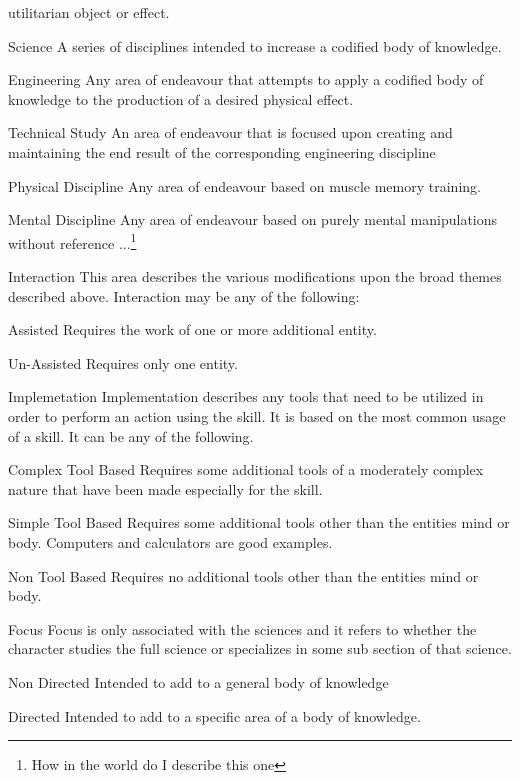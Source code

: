 \begin{relate}
\begin{relate}
		utilitarian object or effect.
		\item[Science]
		A series of disciplines intended to increase a codified body of
		knowledge.
		\item[Engineering]
		Any area of endeavour that attempts to apply a codified body of
		knowledge to the production of a desired physical effect.
		\item[Technical Study]
		An area of endeavour that is focused upon creating and maintaining the
		end result of the corresponding engineering discipline
		\item[Physical Discipline]
		Any area of endeavour based on muscle memory training.
		\item[Mental Discipline]
		Any area of endeavour based on purely mental manipulations without 
		reference ...\footnote{How in the world do I describe this one}
		\end{relate}
		\item[Interaction]
		This area describes the various modifications upon the broad themes
		described above. Interaction may be any of the following:
		\begin{relate}
			\item[Assisted]
			Requires the work of one or more additional entity.
			\item[Un-Assisted]
			Requires only one entity.
		\end{relate}
	\item[Implemetation]
	Implementation describes any tools that need to be utilized in order 
	to perform an action using the skill. It is based on the most common
	usage of a skill. It can be any of the following.
	\begin{relate}
		\item[Complex Tool Based]
		Requires some additional tools of a moderately complex nature that have been
		made especially for the skill.
		\item[Simple Tool Based]
		Requires some additional tools other than the entities mind or body. 
		Computers and calculators are good examples.
		\item[Non Tool Based]
		Requires no additional tools other than the entities mind or body.
	\end{relate}
	\item[Focus]
	Focus is only associated with the sciences and it refers to whether 
	the character studies the full science or specializes in some sub 
	section of that science.
	\begin{relate}
		\item[Non Directed]
		Intended to add to a general body of knowledge
		\item[Directed]
		Intended to add to a specific area of a body of knowledge.
	\end{relate}
\end{relate}

